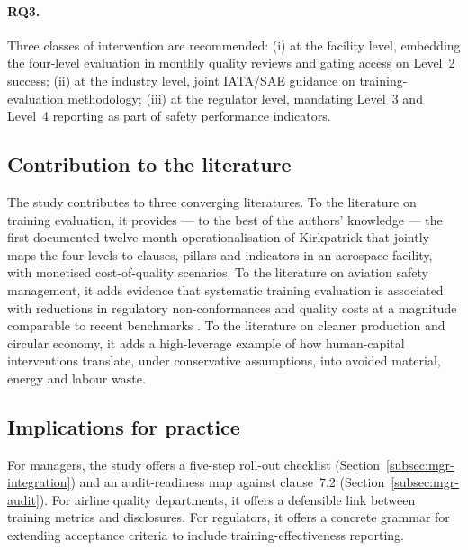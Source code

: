 \paragraph{RQ3.} Three classes of intervention are recommended:
(i) at the facility level, embedding the four-level evaluation in monthly
quality reviews and gating \ERP{} access on Level~2 success;
(ii) at the industry level, joint IATA/SAE guidance on
training-evaluation methodology; (iii) at the regulator level, mandating
Level~3 and Level~4 reporting as part of \SMS{} safety performance
indicators.

\subsection{Contribution to the literature}
\label{subsec:contribution-lit}

The study contributes to three converging literatures. To the literature
on training evaluation, it provides --- to the best of the authors'
knowledge --- the first documented twelve-month operationalisation of
Kirkpatrick that jointly maps the four levels to \AS{} clauses, \SMS{}
pillars and \ESG{} indicators in an aerospace \MRO{} facility, with
monetised cost-of-quality scenarios. To the literature on aviation
safety management, it adds evidence that systematic training evaluation
is associated with reductions in regulatory non-conformances and quality
costs at a magnitude comparable to recent benchmarks
\citep{Zhang2025,Sousa2025}. To the literature on cleaner production and
circular economy, it adds a high-leverage example of how human-capital
interventions translate, under conservative assumptions, into avoided
material, energy and labour waste.

\subsection{Implications for practice}
\label{subsec:impl-practice}

For \MRO{} managers, the study offers a five-step roll-out checklist
(Section~\ref{subsec:mgr-integration}) and an audit-readiness map against
\AS{} clause~7.2 (Section~\ref{subsec:mgr-audit}). For airline quality
departments, it offers a defensible link between training metrics and
\ESG{} disclosures. For regulators, it offers a concrete grammar for
extending \SMS{} acceptance criteria to include training-effectiveness
reporting.


